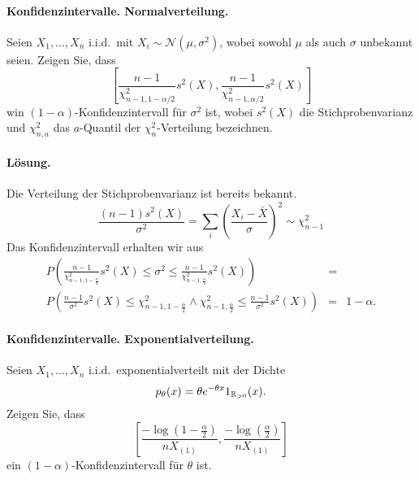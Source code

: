 \paragraph{Konfidenzintervalle. Normalverteilung. } Seien $X_1,\ldots,X_n$ i.i.d.\ mit 
$X_i\sim \mathcal N(\mu,\sigma^2)$, wobei sowohl $\mu$ als auch $\sigma$ unbekannt seien.
Zeigen Sie, dass
\begin{equation}
    \left[ \frac{n-1}{\chi^2_{n-1,1-\alpha/2}}s^2(X), \frac{n-1}{\chi^2_{n-1,\alpha/2}}s^2(X) \right]
    \label{}
\end{equation}
win $\left( 1-\alpha \right)$-Konfidenzintervall für $\sigma^2$ ist, wobei
$s^2(X)$ die Stichprobenvarianz und $\chi^2_{n,a}$ das $a$-Quantil der $\chi^2_n$-Verteilung bezeichnen.

\paragraph*{Lösung.} Die Verteilung der Stichprobenvarianz ist bereits bekannt.
\begin{equation}
    \frac{(n-1) s^2(X)}{\sigma^2} = \sum_{i}^{} \left( \frac{ X_i -\bar X}{\sigma} \right)^2
    \sim \chi^2_{n-1}
\end{equation}
Das Konfidenzintervall erhalten wir aus
\begin{eqnarray}
    P \left( \frac{n-1}{\chi^2_{n-1,1-\frac{\alpha}{2}} } s^2(X) 
    \leq \sigma^2 \leq 
    \frac{n-1}{ \chi^2_{n-1,\frac{\alpha}{2}} } s^2(X)
    \right) &=& \\
    P \left( \frac{n-1}{\sigma^2} s^{2}(X) \leq \chi^2_{n-1,1-\frac{\alpha}{2}} \wedge
    \chi^2_{n-1,\frac{\alpha}{2}} \leq \frac{n-1}{\sigma^2} s^2(X)
    \right) &=& 1-\alpha.
\end{eqnarray}








\paragraph{Konfidenzintervalle. Exponentialverteilung.  }
Seien $X_1,\ldots,X_n$ i.i.d.\ exponentialverteilt mit der Dichte
\begin{equation}
    p_\theta(x) = \theta e^{- \theta x} 1_{ \mathbb R_{>0} }(x).
\end{equation}
Zeigen Sie, dass 
\begin{equation}
    \left[  \frac{- \log \left( 1 - \frac{\alpha}{2} \right)}{n X_{(1)}}, 
    \frac{- \log \left( \frac{\alpha}{2} \right)}{n X_{(1)}} \right]
\end{equation}
ein $(1-\alpha)$-Konfidenzintervall für $\theta$ ist.

